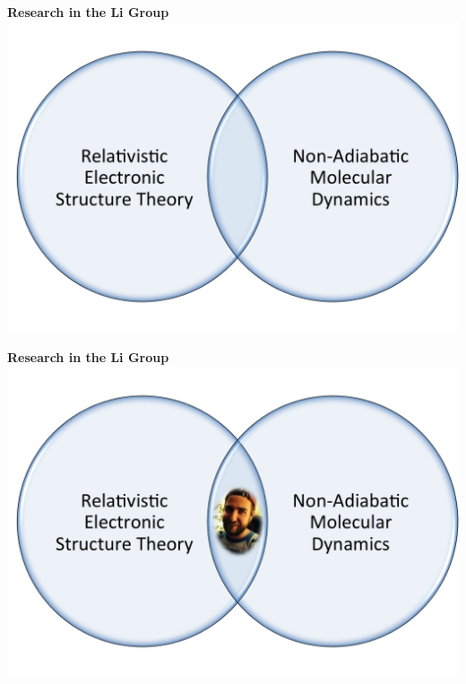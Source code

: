 \documentclass[usepdftitle=false,10pt]{beamer}
\begin{document}
\begin{frame}
\begin{center}
  {\LARGE \bf Research in the Li Group}
  \includegraphics[width=\textwidth]{Venn}
\end{center}
\end{frame}
\begin{frame}
\begin{center}
  {\LARGE \bf Research in the Li Group}
  \includegraphics[width=\textwidth]{VennWPic}
\end{center}
\end{frame}
\end{document}
